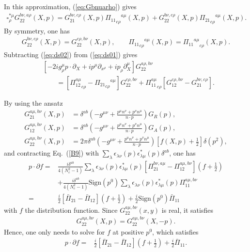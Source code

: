 \documentclass[onecolumn,showpacs,nobibnotes,nofootinbib,12pt,aps,prd,showpacs,notitlepage,nofootinbib,preprintnumbers,amsmath,amssymb]{article}
\def\eq#1{{Eq.~(\ref{#1})}}
\begin{document}
In this approximation, (\ref{eq:Gbnuarho}) gives
\begin{align}
  \square^{*\mu}_{\rho}G^{b\nu, a\rho}_{22}(X,p)=G^{
    b\nu,c\rho}_{21}(X,p) {{\Pi_{11}}_{c\rho}}^{a\mu}(X,p)+G^{
    b\nu,c\rho}_{22}(X, p)
  {{\Pi_{21}}_{c\rho}}^{a\mu}(X,p).\label{eq:ds02}
\end{align}
By symmetry, one has
\begin{align}
  G^{ b\nu,c\rho}_{22}(X,p)=G^{c\rho, b\nu}_{22}(X,p),\qquad
  {{\Pi_{11}}_{c\rho}}^{a\mu}(X,p)={{\Pi_{11}}^{a\mu}}_{c\rho}(X,p).
\end{align}
Subtracting (\ref{eq:ds02}) from (\ref{eq:ds01}) gives
\begin{align}
  &\left[-2i g^\mu_\rho p\cdot \partial_X+ip^\mu\partial_{x^\rho}+ip_\rho \partial_X^\mu\right]G^{a\rho, b\nu}_{22}\nonumber\\
  &\qquad=\left[{\Pi_{12}^{a\mu}}_{c\rho}-{{\Pi_{21}}_{c\rho}}^{a\mu}\right]G^{c\rho,
    b\nu}_{22}+{\Pi_{11}^{a\mu}}_{c\rho}\left[G^{c\rho, b\nu}_{12}-G^{
      b\nu,c\rho}_{21}\right]. \label{B9}
\end{align}

By using the ansatz \cite{Kadanoff,Chou:1984es,Blaizot:2001nr} 
\begin{align}
  G_{21}^{a\mu,b\nu}(X,p)&=\delta^{ab}\left(-g^{\mu\nu}+\frac{p^\mu n^\nu+p^\nu n^\mu}{n\cdot p}\right)G_R(p),\nonumber\\
  G_{12}^{a\mu,b\nu}(X,p)&=\delta^{ab}\left(-g^{\mu\nu}+\frac{p^\mu n^\nu+p^\nu n^\mu}{n\cdot p}\right)G_A(p),\nonumber\\
  G_{22}^{a\mu,b\nu}(X,p)&=2\pi\delta^{ab}\left(-g^{\mu\nu}+\frac{p^\mu
      n^\nu+p^\nu n^\mu}{n\cdot
      p}\right)\left[f(X,p)+\frac{1}{2}\right]\delta(p^2),\label{eq:quasipart}
\end{align}
and contracting \eq{B9} with
$\sum_\lambda\epsilon_{\lambda\nu}(p)\epsilon^*_{\lambda\mu}(p)\delta^{ab}$,
one has
\begin{align}
  p\cdot \partial f = &\frac{i\delta^{ab}}{ 4(N_c^2-1) }\sum_\lambda\epsilon_{\lambda\nu}(p)\epsilon^*_{\lambda\mu}(p)\left[\Pi_{21}^{b\nu,a\mu}-\Pi_{12}^{a\mu,b\nu}\right]\left(f+\frac{1}{2}\right)\nonumber\\
  &+\frac{i\delta^{ab}}{ 4(N_c^2-1)
  }\text{Sign}(p^0)\sum_\lambda\epsilon_{\lambda\nu}(p)\epsilon^*_{\lambda\mu}(p)\Pi_{11}^{a\mu,b\nu}\nonumber\\
  =&\frac{i}{ 2 }\left[\bar\Pi_{21}-\bar\Pi_{12}\right]\left(f+\frac{1}{2}\right)+\frac{i}{ 2
  }\text{Sign}(p^0)\bar\Pi_{11}
\end{align}
with $f$ the distribution function. Since $G_{22}^{a\mu,b\nu}(x,y)$ is
real, it satisfies
\begin{align}
G_{22}^{a\mu,b\nu}(X,p)=G_{22}^{a\mu,b\nu}(X,-p).
\end{align}
Hence, one only needs to solve for $f$ at positive $p^0$, which
satisfies
\begin{align}
  p\cdot \partial f = &\frac{i}{ 2 }\left[\bar\Pi_{21}-\bar\Pi_{12}\right]\left(f+\frac{1}{2}\right)+\frac{i}{ 2
  }\bar\Pi_{11}.\label{eq:gluonBolt}
\end{align}
\end{document}
